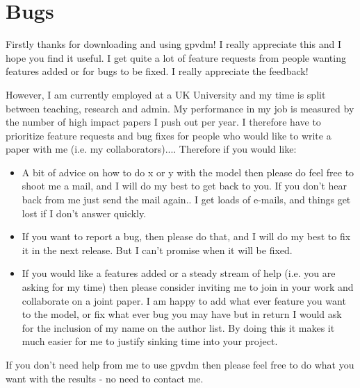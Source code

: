 \section{Bugs}
Firstly thanks for downloading and using gpvdm! I really appreciate this and I hope you find it useful. I get quite a lot of feature requests from people wanting features added or for bugs to be fixed. I really appreciate the feedback!

However, I am currently employed at a UK University and my time is split between teaching, research and admin. My performance in my job is measured by the number of high impact papers I push out per year. I therefore have to prioritize feature requests and bug fixes for people who would like to write a paper with me (i.e. my collaborators).... Therefore if you would like:

\begin{itemize}
  \item A bit of advice on how to do x or y with the model then please do feel free to shoot me a mail, and I will do my best to get back to you. If you don't hear back from me just send the mail again.. I get loads of e-mails, and things get lost if I don't answer quickly.
  \item If you want to report a bug, then please do that, and I will do my best to fix it in the next release. But I can't promise when it will be fixed.
  \item  If you would like a features added or a steady stream of help (i.e. you are asking for my time) then please consider inviting me to join in your work and collaborate on a joint paper. I am happy to add what ever feature you want to the model, or fix what ever bug you may have but in return I would ask for the inclusion of my name on the author list. By doing this it makes it much easier for me to justify sinking time into your project.
\end{itemize}
    
If you don't need help from me to use gpvdm then please feel free to do what you want with the results - no need to contact me.



